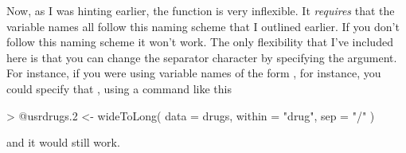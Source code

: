 Now, as I was hinting earlier, the  function is very inflexible. It {\it requires} that the variable names all follow this naming scheme that I outlined earlier. If you don't follow this naming scheme it won't work. The only flexibility that I've included here is that you can change the separator character by specifying the  argument. For instance, if you were using variable names of the form , for instance, you could specify that , using a command like this
\begin{rblock1}
> @usr{drugs.2 <- wideToLong( data = drugs, within = "drug", sep = "/" )}
\end{rblock1}
and it would still work. 



